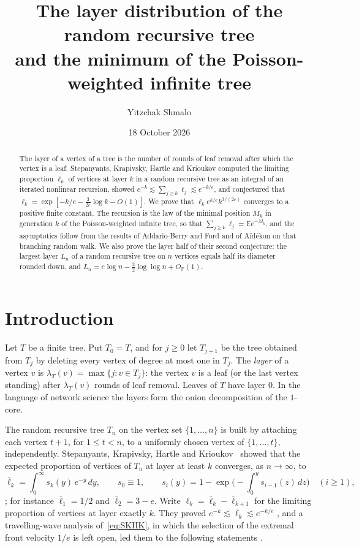 \documentclass[11pt]{amsart}
\title[Layers of the random recursive tree]{The layer distribution of the random recursive tree\\ and the minimum of the Poisson-weighted infinite tree}
\author{Yitzchak Shmalo}
\date{18 October 2026}
\theoremstyle{definition}
\theoremstyle{remark}
\numberwithin{equation}{section}
\newcommand{\PP}{\mathbb P}
\newcommand{\E}{\mathbb E}
\newcommand{\lb}{\bar\ell}
\begin{document}
\begin{abstract}
The layer of a vertex of a tree is the number of rounds of leaf removal after which the vertex is a leaf. Stepanyants, Krapivsky, Hartle and Krioukov computed the limiting proportion $\ell_k$ of vertices at layer $k$ in a random recursive tree as an integral of an iterated nonlinear recursion, showed $e^{-k}\lesssim\sum_{j\ge k}\ell_j\lesssim e^{-k/e}$, and conjectured that $\ell_k=\exp[-k/e-\tfrac{3}{2e}\log k-O(1)]$. We prove that $\ell_k e^{k/e}k^{3/(2e)}$ converges to a positive finite constant. The recursion is the law of the minimal position $M_k$ in generation $k$ of the Poisson-weighted infinite tree, so that $\sum_{j\ge k}\ell_j=\E e^{-M_k}$, and the asymptotics follow from the results of Addario-Berry and Ford and of A\"id\'ekon on that branching random walk. We also prove the layer half of their second conjecture: the largest layer $L_n$ of a random recursive tree on $n$ vertices equals half its diameter rounded down, and $L_n=e\log n-\tfrac32\log\log n+O_\PP(1)$.
\end{abstract}
\maketitle

\section{Introduction}

Let $T$ be a finite tree. Put $T_0=T$, and for $j\ge0$ let $T_{j+1}$ be the tree obtained from $T_j$ by deleting every vertex of degree at most one in $T_j$. The \emph{layer} of a vertex $v$ is $\lambda_T(v)=\max\{j:v\in T_j\}$: the vertex $v$ is a leaf (or the last vertex standing) after $\lambda_T(v)$ rounds of leaf removal. Leaves of $T$ have layer $0$. In the language of network science the layers form the onion decomposition of the $1$-core.

The random recursive tree $T_n$ on the vertex set $\{1,\dots,n\}$ is built by attaching each vertex $t+1$, for $1\le t<n$, to a uniformly chosen vertex of $\{1,\dots,t\}$, independently. Stepanyants, Krapivsky, Hartle and Krioukov~\cite{SKHK} showed that the expected proportion of vertices of $T_n$ at layer at least $k$ converges, as $n\to\infty$, to
\begin{equation}\label{eq:SKHK}
\lb_k=\int_0^\infty s_k(y)\,e^{-y}\,dy,\qquad s_0\equiv1,\qquad s_i(y)=1-\exp\Big(-\int_0^y s_{i-1}(z)\,dz\Big)\quad(i\ge1),
\end{equation}
\cite[Theorem~2]{SKHK}; for instance $\lb_1=1/2$ and $\lb_2=3-e$. Write $\ell_k=\lb_k-\lb_{k+1}$ for the limiting proportion of vertices at layer exactly $k$. They proved $e^{-k}\lesssim\lb_k\lesssim e^{-k/e}$ \cite[Theorem~4]{SKHK}, and a travelling-wave analysis of~\eqref{eq:SKHK}, in which the selection of the extremal front velocity $1/e$ is left open, led them to the following statements \cite[Conjectures~1 and~2]{SKHK}.
\end{document}

